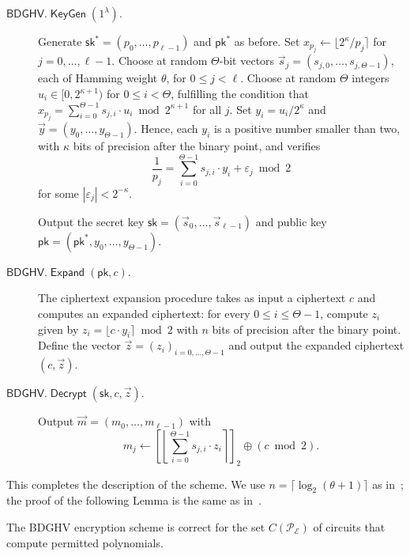 \documentclass[11pt]{llncs}
\renewcommand\leq\leqslant
\newcommand{\abs}[1]{\left|#1\right|}
\DeclareMathOperator{\KeyGen}{\ensuremath{\mathsf{KeyGen}}}
\DeclareMathOperator{\Expand}{\ensuremath{\mathsf{Expand}}}
\DeclareMathOperator{\Decrypt}{\ensuremath{\mathsf{Decrypt}}}
\newcommand*{\pk}{\ensuremath{\mathsf{pk}}}
\newcommand*{\sk}{\ensuremath{\mathsf{sk}}}
\newcommand*{\BDGHV}{\ensuremath{\mathsf{BDGHV}}}
\begin{document}
\begin{description}
\item[$\BDGHV.\KeyGen(1^\lambda)$.] Generate
  $\sk^*=(p_0,\ldots,p_{\ell-1})$ and $\pk^*$ as before. Set $x_{p_j}
  \leftarrow \lfloor 2^\kappa/p_j\rceil$ for
  $j=0,\ldots,{\ell-1}$. Choose at random 
  $\Theta$-bit vectors $\vec s_j=(s_{j,0},\ldots,s_{j,\Theta-1})$,
  each of Hamming weight $\theta$, for $0 \leq j < \ell$.
Choose at random $\Theta$ integers $u_i\in[0, 2^{\kappa+1})$ for $0
  \leq i <\Theta$, fulfilling the condition that
$
x_{p_j}=\sum_{i=0}^{\Theta-1}
s_{j,i} \cdot u_{i} \bmod 2^{\kappa+1}$ for all $j$.
Set $y_i=u_i/2^\kappa$ and $\vec y=(y_0,\ldots,y_{\Theta-1})$. Hence,
each $y_i$ is a positive number smaller than two, with $\kappa$ bits
of precision after the binary point, and verifies 
\begin{equation}
\label{eqpj}
\frac{1}{p_j}=\sum_{i=0}^{\Theta-1}
s_{j,i} \cdot y_{i} + \varepsilon_j \bmod 2
\end{equation}
for some $\abs{\varepsilon_j}<2^{-\kappa}$.

Output the secret key $\sk=(\vec s_0,\ldots,\vec s_{\ell-1})$ and public key $\pk=(\pk^*, y_0, \ldots, y_{\Theta-1})$.
\\\vspace{-0.25cm}
\item[$\BDGHV.\Expand(\pk, c)$.] The ciphertext expansion procedure takes
  as input a ciphertext $c$ and computes an expanded
  ciphertext: for every $0\leq i\leq \Theta-1$, compute $z_i$ given by
$ z_i = \lfloor c\cdot y_i\rceil \bmod 2 $
with $n$ bits of precision after the binary point. Define the vector $\vec z=(z_i)_{i=0,\ldots,\Theta-1}$ and output the expanded ciphertext $(c, \vec z)$.
\\\vspace{-0.25cm}
\item[$\BDGHV.\Decrypt(\sk, c, \vec z)$.] Output $\vec
  m=(m_0,\ldots,m_{\ell-1})$ with 
\begin{equation}
\label{eq:decrypt}
m_j \leftarrow\left[\left\lfloor\sum_{i=0}^{\Theta-1}
s_{j,i} \cdot z_{i}\right\rceil\right]_2 \oplus
(c \bmod 2). 
\end{equation}
\end{description}
This completes the description of the scheme. 
We
use $n=\lceil \log_2 (\theta+1) \rceil$ as in~\cite{CMNT2011}; the
proof of the following Lemma is  the same as in~\cite[Appendix~E]{CMNT2011}.

\begin{lemma}The BDGHV encryption scheme is correct for the set $C(\mathcal {P_E})$ of
  circuits that compute permitted polynomials.\end{lemma} 
\end{document}
